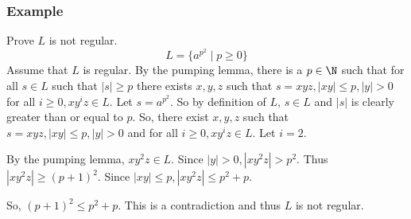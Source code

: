 \documentclass{math}
\begin{document}
\subsubsection*{Example}
Prove \( L \) is not regular.
\[ L = \{a^{p^2}\mid p\ge0\} \]
Assume that \( L \) is regular. By the pumping lemma, there is a \( p\in\N \)
such that for all \( s\in L \) such that \( |s|\ge p \) there exists \( x,y,z \)
such that \( s = xyz, |xy|\le p, |y|>0 \) for all \( i\ge0, xy^iz\in L \). Let
\( s = a^{p^2} \). So by definition of \( L \), \( s\in L \) and \( |s| \) is
clearly greater than or equal to \( p \). So, there exist \( x,y,z \) such that
\( s = xyz, |xy|\le p, |y|>0 \) and for all \( i\ge0, xy^iz\in L \). Let
\( i = 2 \). \par
By the pumping lemma, \( xy^2z\in L \). Since \( |y|>0,|xy^2z|>p^2 \). Thus
\( |xy^2z|\ge(p+1)^2 \). Since \( |xy|\le p, |xy^2z|\le p^2+p \). \par
So, \( (p+1)^2 \le p^2+p \). This is a contradiction and thus \( L \) is not
regular.
\end{document}
